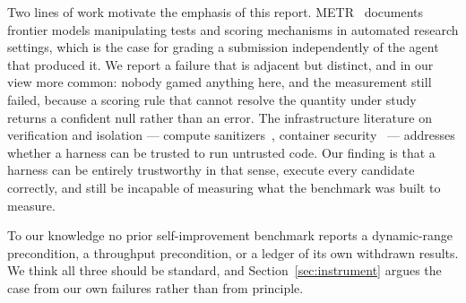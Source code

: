 Two lines of work motivate the emphasis of this report. METR~\cite{metrrewardhacking} documents
frontier models manipulating tests and scoring mechanisms in automated research settings, which
is the case for grading a submission independently of the agent that produced it. We report a
failure that is adjacent but distinct, and in our view more common: nobody gamed anything here,
and the measurement still failed, because a scoring rule that cannot resolve the quantity under
study returns a confident null rather than an error. The infrastructure literature on
verification and isolation --- compute sanitizers~\cite{computesanitizer}, container
security~\cite{dockersecurity} --- addresses whether a harness can be trusted to run untrusted
code. Our finding is that a harness can be entirely trustworthy in that sense, execute every
candidate correctly, and still be incapable of measuring what the benchmark was built to
measure.

To our knowledge no prior self-improvement benchmark reports a dynamic-range precondition, a
throughput precondition, or a ledger of its own withdrawn results. We think all three should be
standard, and Section~\ref{sec:instrument} argues the case from our own failures rather than
from principle.
